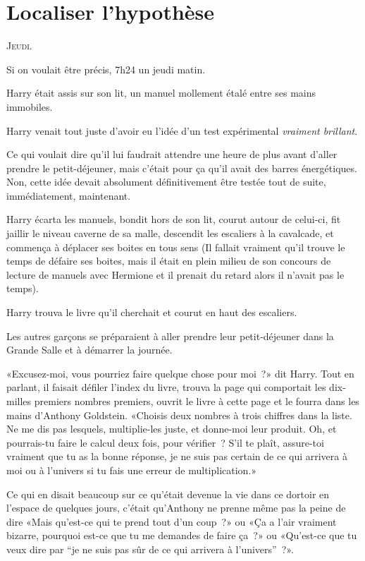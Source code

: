 \chapter{Localiser l'hypothèse}

\lettrine{J}{eudi}.

\hplettrineextrapara
Si on voulait être précis, 7h24 un jeudi matin.

Harry était assis sur son lit, un manuel mollement étalé entre ses mains immobiles.

Harry venait tout juste d'avoir eu l'idée d'un test expérimental \emph{vraiment brillant}.

Ce qui voulait dire qu'il lui faudrait attendre une heure de plus avant d'aller prendre le petit-déjeuner, mais c'était pour ça qu'il avait des barres énergétiques. Non, cette idée devait absolument définitivement être testée tout de suite, immédiatement, maintenant.

Harry écarta les manuels, bondit hors de son lit, courut autour de celui-ci, fit jaillir le niveau caverne de sa malle, descendit les escaliers à la cavalcade, et commença à déplacer ses boites en tous sens (Il fallait vraiment qu'il trouve le temps de défaire ses boites, mais il était en plein milieu de son concours de lecture de manuels avec Hermione et il prenait du retard alors il n'avait pas le temps).

Harry trouva le livre qu'il cherchait et courut en haut des escaliers.

Les autres garçons se préparaient à aller prendre leur petit-déjeuner dans la Grande Salle et à démarrer la journée.

«Excusez-moi, vous pourriez faire quelque chose pour moi~?» dit Harry. Tout en parlant, il faisait défiler l'index du livre, trouva la page qui comportait les dix-milles premiers nombres premiers, ouvrit le livre à cette page et le fourra dans les mains d'Anthony Goldstein. «Choisis deux nombres à trois chiffres dans la liste. Ne me dis pas lesquels, multiplie-les juste, et donne-moi leur produit. Oh, et pourrais-tu faire le calcul deux fois, pour vérifier~? S'il te plaît, assure-toi vraiment que tu as la bonne réponse, je ne suis pas certain de ce qui arrivera à moi ou à l'univers si tu fais une erreur de multiplication.»

Ce qui en disait beaucoup sur ce qu'était devenue la vie dans ce dortoir en l'espace de quelques jours, c'était qu'Anthony ne prenne même pas la peine de dire «Mais qu'est-ce qui te prend tout d'un coup~?» ou «Ça a l'air vraiment bizarre, pourquoi est-ce que tu me demandes de faire ça~?» ou «Qu'est-ce que tu veux dire par “je ne suis pas sûr de ce qui arrivera à l'univers”~?».

